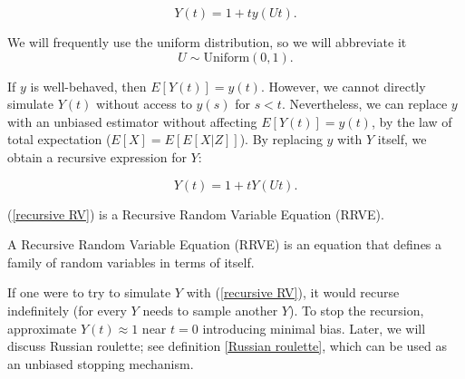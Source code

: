 \documentclass[a4paper,12pt]{article}
\begin{document}
\begin{equation}
    Y(t) = 1 + t  y(Ut).
\end{equation}

\begin{notation}[$U$]
    We will frequently use the uniform distribution, so we will abbreviate it
    \begin{equation}
        U \sim \text{Uniform}(0,1).
    \end{equation}
\end{notation}

If $y$ is well-behaved, then $E[Y(t)] = y(t)$.
However, we cannot directly simulate $Y(t)$ without access
to $y(s)$ for $s < t$. Nevertheless, we can replace $y$ with
an unbiased estimator without affecting $E[Y(t)] = y(t)$,
by the law of total expectation ($E[X] = E[E[X|Z]]$).
By replacing $y$ with $Y$ itself, we obtain a recursive
expression for $Y$:

\begin{equation} \label{recursive RV}
    Y(t) = 1 + t  Y(Ut).
\end{equation}

(\ref{recursive RV}) is a Recursive Random Variable
Equation (RRVE).

\begin{definition}
    A Recursive Random Variable Equation (RRVE) is
    an equation that defines a
    family of random variables in terms of itself.
\end{definition}

If one were to try to simulate $Y$ with (\ref{recursive RV}),
it would recurse indefinitely (for every $Y$ needs to sample another $Y$).
To stop the recursion, approximate
$Y(t) \approx 1$ near $t = 0$ introducing minimal bias.
Later, we will discuss Russian roulette; see definition \ref{Russian roulette},
which can be used as an unbiased stopping mechanism.

\vspace*{0.2cm}
\end{document}
